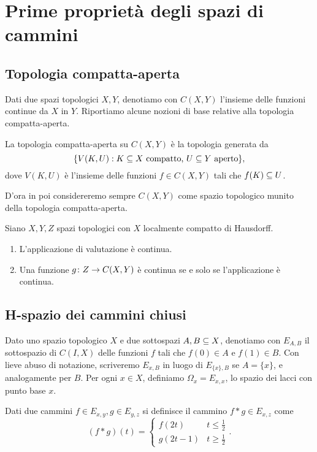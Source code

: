 \section{Prime proprietà degli spazi di cammini}
\subsection{Topologia compatta-aperta}
Dati due spazi topologici $X,Y$, denotiamo con $C(X,Y)$ l'insieme delle funzioni continue da $X$ in $Y$. Riportiamo alcune nozioni di base relative alla topologia compatta-aperta.
\begin{definition}
La topologia compatta-aperta su $C(X,Y)$ è la topologia generata da 
$$
\{V(K,U):\text{$K\subseteq X$ compatto, $U\subseteq Y$ aperto}\},
$$
dove $V(K,U)$ è l'insieme delle funzioni $f\in C(X,Y)$ tali che $f(K)\subseteq U$.
\end{definition}
D'ora in poi considereremo sempre $C(X,Y)$ come spazio topologico munito della topologia compatta-aperta.
\begin{proposition}
Siano $X,Y,Z$ spazi topologici con $X$ localmente compatto di Hausdorff.
\begin{enumerate}
\item L'applicazione di valutazione
è continua.
\item Una funzione $g\colon Z\to C(X,Y)$ è continua se e solo se l'applicazione
è continua.
\end{enumerate}
\end{proposition}

\subsection{H-spazio dei cammini chiusi}

Dato uno spazio topologico $X$ e due sottospazi $A,B\subseteq X$, denotiamo con $E_{A,B}$ il sottospazio di $C(I,X)$ delle funzioni $f$ tali che $f(0)\in A$ e $f(1)\in B$. Con lieve abuso di notazione, scriveremo $E_{x,B}$ in luogo di $E_{\{x\},B}$ se $A=\{x\}$, e analogamente per $B$. Per ogni $x\in X$, definiamo $\Omega_x=E_{x,x}$, lo spazio dei lacci con punto base $x$.

Dati due cammini $f\in E_{x,y},g\in E_{y,z}$ si definisce il cammino $f\ast g\in E_{x,z}$ come
$$
(f\ast g)(t)=
\begin{cases}
f(2t)&t\le\frac{1}{2}\\
g(2t-1)&t\ge\frac{1}{2}
\end{cases}.
$$

